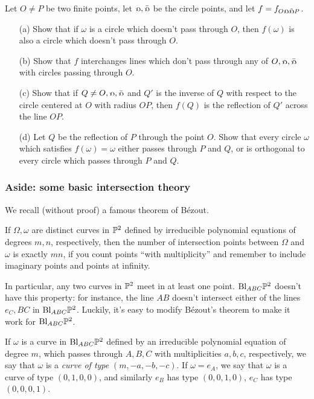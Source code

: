 \begin{exer} Let $O \ne P$ be two finite points, let $\fish, \bar\fish$ be the circle points, and let $f = f_{O \fish \bar\fish P}$.
\begin{itemize}
\item[(a)] Show that if $\omega$ is a circle which doesn't pass through $O$, then $f(\omega)$ is also a circle which doesn't pass through $O$.

\item[(b)] Show that $f$ interchanges lines which don't pass through any of $O,\fish,\bar\fish$ with circles passing through $O$.

\item[(c)] Show that if $Q \ne O, \fish, \bar\fish$ and $Q'$ is the inverse of $Q$ with respect to the circle centered at $O$ with radius $OP$, then $f(Q)$ is the reflection of $Q'$ across the line $OP$.

\item[(d)] Let $Q$ be the reflection of $P$ through the point $O$. Show that every circle $\omega$ which satisfies $f(\omega) = \omega$ either passes through $P$ and $Q$, or is orthogonal to every circle which passes through $P$ and $Q$.
\end{itemize}
\end{exer}

\subsubsection{Aside: some basic intersection theory}

We recall (without proof) a famous theorem of B\'ezout.

\begin{thm}[B\'ezout] If $\Omega,\omega$ are distinct curves in $\mathbb{P}^2$ defined by irreducible polynomial equations of degrees $m,n$, respectively, then the number of intersection points between $\Omega$ and $\omega$ is exactly $mn$, if you count points ``with multiplicity'' and remember to include imaginary points and points at infinity.
\end{thm}

In particular, any two curves in $\mathbb{P}^2$ meet in at least one point. $\text{\rm Bl}_{ABC}\mathbb{P}^2$ doesn't have this property: for instance, the line $AB$ doesn't intersect either of the lines $e_C, BC$ in $\text{\rm Bl}_{ABC}\mathbb{P}^2$. Luckily, it's easy to modify B\'ezout's theorem to make it work for $\text{\rm Bl}_{ABC}\mathbb{P}^2$.

\begin{defn} If $\omega$ is a curve in $\text{\rm Bl}_{ABC}\mathbb{P}^2$ defined by an irreducible polynomial equation of degree $m$, which passes through $A,B,C$ with multiplicities $a,b,c$, respectively, we say that $\omega$ is a \emph{curve of type} $(m,-a,-b,-c)$. If $\omega = e_A$, we say that $\omega$ is a curve of type $(0,1,0,0)$, and similarly $e_B$ has type $(0,0,1,0)$, $e_C$ has type $(0,0,0,1)$.
\end{defn}

